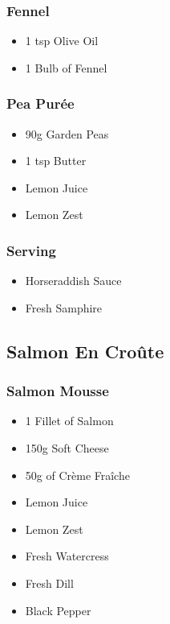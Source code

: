 \documentclass[11pt, english]{article}
\begin{document}
		\subsubsection*{Fennel}

	\begin{itemize}
	\setlength\itemsep{0cm}
		\item 1 tsp Olive Oil
		\item 1 Bulb of Fennel
	\end{itemize}

		\subsubsection*{Pea Pur\'{e}e}

	\begin{itemize}
        \setlength\itemsep{0cm}
		\item 90g Garden Peas
		\item 1 tsp Butter
		\item Lemon Juice
		\item Lemon Zest		
        \end{itemize}

		\subsubsection*{Serving}

	\begin{itemize}
        \setlength\itemsep{0cm}
		\item Horseraddish Sauce
		\item Fresh Samphire
        \end{itemize}

\newpage

	\subsection{Salmon En Cro\^{u}te}

		\subsubsection*{Salmon Mousse}

	\begin{itemize}
        \setlength\itemsep{0cm}
                \item 1 Fillet of Salmon
		\item 150g Soft Cheese
		\item 50g of Cr\`{e}me Fra\^{i}che
		\item Lemon Juice
		\item Lemon Zest
		\item Fresh Watercress
		\item Fresh Dill
		\item Black Pepper
        \end{itemize}
\end{document}
